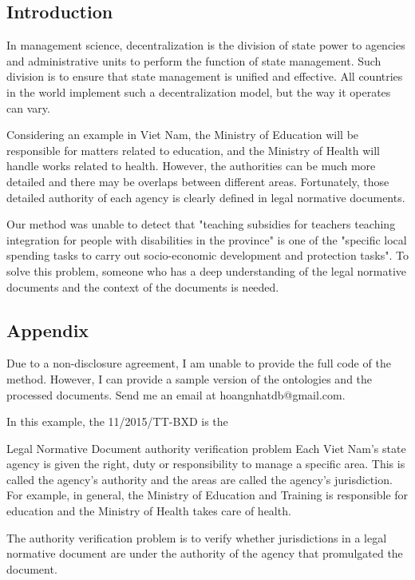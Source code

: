 \begin{algorithm}
\subsection{Introduction}

In management science, decentralization is the division of state power to agencies and administrative units to perform the function of state management. Such division is to ensure that state management is unified and effective. All countries in the world implement such a decentralization model, but the way it operates can vary.

Considering an example in Viet Nam, the Ministry of Education will be responsible for matters related to education, and the Ministry of Health will handle works related to health. However, the authorities can be much more detailed and there may be overlaps between different areas. Fortunately, those detailed authority of each agency is clearly defined in legal normative documents.

Our method was unable to detect that "teaching subsidies for teachers teaching integration for people with disabilities in the province" is one of the "specific local spending tasks to carry out socio-economic development and protection tasks". To solve this problem, someone who has a deep understanding of the legal normative documents and the context of the documents is needed.

\subsection{Appendix}

Due to a non-disclosure agreement, I am unable to provide the full code of the method. However, I can provide a sample version of the ontologies and the processed documents. Send me an email at hoangnhatdb@gmail.com. 

In this example, the 11/2015/TT-BXD is the 

\begin{frame}{Legal Normative Document authority verification problem}
    Each Viet Nam's state agency is given the right, duty or responsibility to manage a specific area. This is called the agency's authority and the areas are called the agency's jurisdiction.
    For example, in general, the Ministry of Education and Training is responsible for education and the Ministry of Health takes care of health.

    The authority verification problem is to verify whether jurisdictions in a legal normative document are under the authority of the agency that promulgated the document.
\end{frame}


\end{algorithm}
